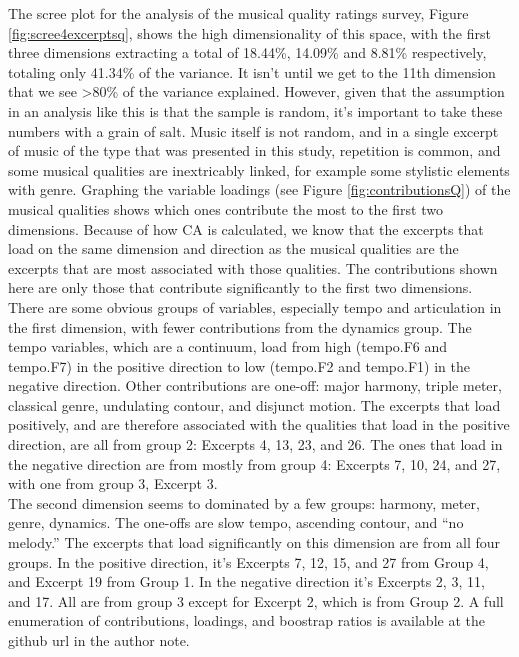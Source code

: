 \documentclass[
  english,
  man,floatsintext]{apa6}
\begin{document}
The scree plot for the analysis of the musical quality ratings survey, Figure \ref{fig:scree4excerptsq}, shows the high dimensionality of this space, with the first three dimensions extracting a total of 18.44\%, 14.09\% and 8.81\% respectively, totaling only 41.34\% of the variance. It isn't until we get to the 11th dimension that we see \textgreater80\% of the variance explained. However, given that the assumption in an analysis like this is that the sample is random, it's important to take these numbers with a grain of salt. Music itself is not random, and in a single excerpt of music of the type that was presented in this study, repetition is common, and some musical qualities are inextricably linked, for example some stylistic elements with genre.
Graphing the variable loadings (see Figure \ref{fig:contributionsQ}) of the musical qualities shows which ones contribute the most to the first two dimensions. Because of how CA is calculated, we know that the excerpts that load on the same dimension and direction as the musical qualities are the excerpts that are most associated with those qualities. The contributions shown here are only those that contribute significantly to the first two dimensions.
There are some obvious groups of variables, especially tempo and articulation in the first dimension, with fewer contributions from the dynamics group. The tempo variables, which are a continuum, load from high (tempo.F6 and tempo.F7) in the positive direction to low (tempo.F2 and tempo.F1) in the negative direction. Other contributions are one-off: major harmony, triple meter, classical genre, undulating contour, and disjunct motion. The excerpts that load positively, and are therefore associated with the qualities that load in the positive direction, are all from group 2: Excerpts 4, 13, 23, and 26. The ones that load in the negative direction are from mostly from group 4: Excerpts 7, 10, 24, and 27, with one from group 3, Excerpt 3.\\
The second dimension seems to dominated by a few groups: harmony, meter, genre, dynamics. The one-offs are slow tempo, ascending contour, and ``no melody.'' The excerpts that load significantly on this dimension are from all four groups. In the positive direction, it's Excerpts 7, 12, 15, and 27 from Group 4, and Excerpt 19 from Group 1. In the negative direction it's Excerpts 2, 3, 11, and 17. All are from group 3 except for Excerpt 2, which is from Group 2. A full enumeration of contributions, loadings, and boostrap ratios is available at the github url in the author note.
\end{document}
